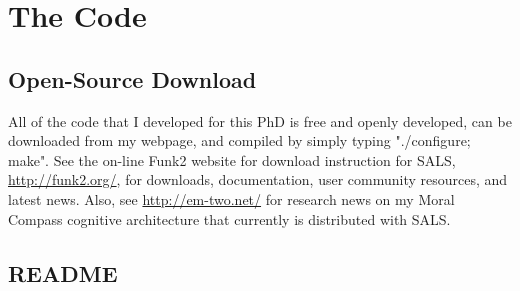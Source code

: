 \chapter{The Code}\label{appendix:the_code}

\section{Open-Source Download}

All of the code that I developed for this PhD is free and openly
developed, can be downloaded from my webpage, and compiled by simply
typing "./configure; make".  See the on-line Funk2 website for
download instruction for SALS, \url{http://funk2.org/}, for downloads,
documentation, user community resources, and latest news.  Also, see
\url{http://em-two.net/} for research news on my Moral Compass
cognitive architecture that currently is distributed with SALS.

\section{README}

